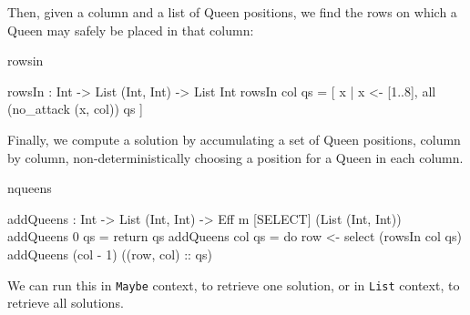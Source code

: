 \noindent
Then, given a column and a list of Queen positions, we find the rows on which
a Queen may safely be placed in that column:

\begin{SaveVerbatim}{rowsin}

rowsIn : Int -> List (Int, Int) -> List Int
rowsIn col qs 
   = [ x | x <- [1..8], all (no_attack (x, col)) qs ]

\end{SaveVerbatim}

\noindent
Finally, we compute a solution by accumulating a set of Queen positions,
column by column, non-deterministically choosing a position for a Queen in
each column.

\begin{SaveVerbatim}{nqueens}

addQueens : Int -> List (Int, Int) -> 
            Eff m [SELECT] (List (Int, Int))
addQueens 0   qs = return qs
addQueens col qs 
   = do row <- select (rowsIn col qs)
        addQueens (col - 1) ((row, col) :: qs)

\end{SaveVerbatim}

\noindent
We can run this in \texttt{Maybe} context, to retrieve one solution, or in
\texttt{List} context, to retrieve all solutions.

